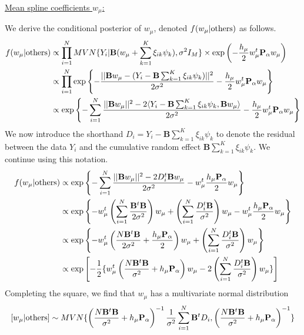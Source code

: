 \documentclass[12pt]{article}
\begin{document}
\vspace{0.5em}
\underline{Mean spline coefficients $w_\mu$:}

We derive the conditional posterior of $w_\mu$, denoted $f(w_\mu|{\rm others})$ as follows.
\begin{align*}
    f(w_\mu|{\rm others}) & \propto \prod_{i = 1}^N  MVN\{Y_i|\mathbf{B}(w_{\mu} + \sum_{k = 1}^K \xi_{ik} \psi_{k}), \sigma^2 I_M\} \times \exp\left(-\frac{h_{\mu}}{2} w^t_{\mu}\mathbf{P}_{\alpha} w_{\mu}\right) \\
    & \propto \prod_{i = 1}^N \exp\left\{-\frac{||\mathbf{B}w_\mu - (Y_i - \mathbf{B}\sum_{k = 1}^K \xi_{ik} \psi_k)||^2}{2\sigma^2} - \frac{h_{\mu}}{2} w^t_{\mu}\mathbf{P}_{\alpha} w_{\mu} \right\} \\
    & \propto \exp\left\{-\sum_{i = 1}^N\frac{||\mathbf{B}w_\mu||^2 - 2\langle Y_i - \mathbf{B}\sum_{k = 1}^K \xi_{ik} \psi_k, \mathbf{B}w_\mu \rangle}{2\sigma^2} - \frac{h_{\mu}}{2} w^t_{\mu}\mathbf{P}_{\alpha} w_{\mu} \right\}
\end{align*}
We now introduce the shorthand $D_i = Y_i - \mathbf{B}\sum_{k = 1}^K \xi_{ik} \psi_k$ to denote the residual between the data $Y_i$ and the cumulative random effect $\mathbf{B}\sum_{k = 1}^K \xi_{ik} \psi_k$. We continue using this notation.
\begin{align*}
    f(w_\mu|{\rm others}) & \propto \exp\left\{-\sum_{i = 1}^N\frac{||\mathbf{B}w_\mu||^2 - 2D_i^t \mathbf{B}w_\mu}{2\sigma^2} - w^t_{\mu}\frac{h_\mu \mathbf{P}_\alpha}{2} w_{\mu} \right\}\\
    & \propto \exp\left\{- w_\mu^t \left(\sum_{i = 1}^N \frac{ \mathbf{B}^t \mathbf{B}}{2\sigma^2}\right) w_\mu + \left(\sum_{i = 1}^N\frac{D_i^t \mathbf{B}}{\sigma^2} \right) w_\mu - w^t_{\mu}\frac{h_\mu \mathbf{P}_\alpha}{2} w_{\mu} \right\}\\
    & \propto \exp\left\{- w_\mu^t \left(\frac{N \mathbf{B}^t \mathbf{B}}{2\sigma^2}  + \frac{h_\mu \mathbf{P}_\alpha}{2}\right) w_\mu + \left(\sum_{i = 1}^N\frac{D_i^t \mathbf{B}}{\sigma^2} \right) w_\mu\right\}\\
    & \propto \exp\left[-\frac{1}{2}\{ w_\mu^t \left(\frac{N \mathbf{B}^t \mathbf{B}}{\sigma^2}  + h_\mu \mathbf{P}_\alpha\right) w_\mu - 2\left(\sum_{i = 1}^N\frac{D_i^t \mathbf{B}}{\sigma^2} \right) w_\mu\}\right]
\end{align*}
Completing the square, we find that $w_\mu$ has a multivariate normal distribution
$$[w_\mu|{\rm others}] \sim MVN\{\left(\frac{N\mathbf{B}^t\mathbf{B}}{\sigma^2} + h_\mu \mathbf{P}_\alpha \right)^{-1} \frac{1}{\sigma^2}\sum_{i =1}^N \mathbf{B}^tD_i,\left(\frac{N\mathbf{B}^t\mathbf{B}}{\sigma^2} + h_\mu \mathbf{P}_\alpha \right)^{-1}\}$$
\end{document}
